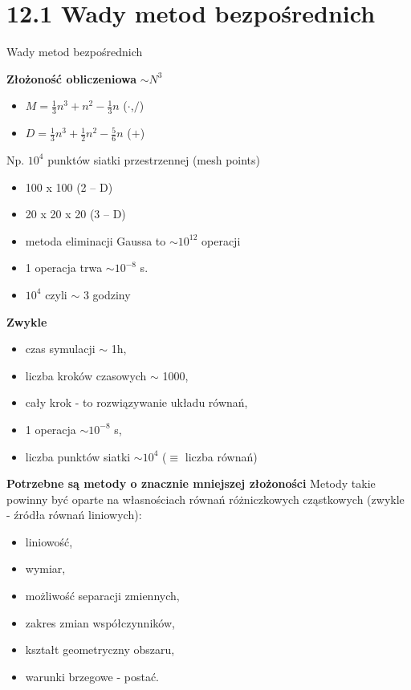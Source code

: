 \section{12.1 Wady metod bezpośrednich}

\begin{frame}{Wady metod bezpośrednich}
  \begin{block}{\textbf{Złożoność obliczeniowa} ${\sim}N^3$}
    \begin{itemize}
      \item{ $M=\frac{1}{3}n^3+n^2-\frac{1}{3}n$ ($\cdot$,$/$)}
      \item{ $D=\frac{1}{3}n^3+\frac{1}{2}n^2-\frac{5}{6}n$ ($+$)}
    \end{itemize}
    Np. $10^4$ punktów siatki przestrzennej (mesh points)
    \begin{itemize}
      \item{100 x 100   (2 -- D)}
      \item{20 x 20 x 20   (3 -- D)}
      \item{metoda eliminacji Gaussa to $\sim 10^{12}$ operacji}
      \item{1 operacja trwa $\sim 10^{-8}$ s.}
      \item{$10^4$ czyli $\sim$ 3 godziny}
    \end{itemize}
  \end{block}
\end{frame}

\begin{frame}{}
  \begin{block}{\textbf{Zwykle}}
    \begin{itemize}
      \item{czas symulacji $\sim$ 1h,}
      \item{liczba kroków czasowych $\sim$ 1000,}
      \item{cały krok - to rozwiązywanie układu równań,}
      \item{1 operacja $\sim 10^{-8}$ s,}
      \item{liczba punktów siatki $\sim 10^4$ ($\equiv$ liczba równań)}
    \end{itemize}
  \end{block}
\end{frame}

\begin{frame}{}
  \begin{block}{\textbf{Potrzebne są metody o znacznie mniejszej złożoności}}
    Metody takie powinny być oparte na własnościach równań różniczkowych cząstkowych (zwykle - źródła równań liniowych):
    \begin{itemize}
      \item{liniowość,}
      \item{wymiar,}
      \item{możliwość separacji zmiennych,}
      \item{zakres zmian współczynników,}
      \item{kształt geometryczny obszaru,}
      \item{warunki brzegowe - postać.}
    \end{itemize}
  \end{block}
\end{frame}

